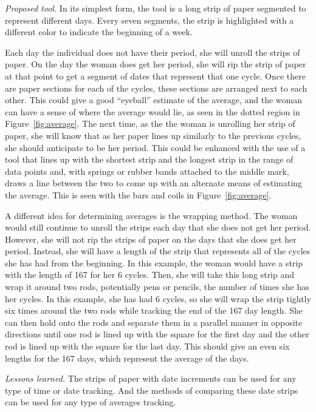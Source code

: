 \documentclass{sig-alternate}
\begin{document}
\emph{Proposed tool.}
In its simplest form, the tool is a long strip of paper segmented to represent different days. Every seven segments, the strip is highlighted with a different color to indicate the beginning of a week.

Each day the individual does not have their period, she will unroll the strips of paper. 
On the day the woman does get her period, she will rip the strip of paper at that point to get a segment of dates that represent that one cycle. Once there are paper sections for each of the cycles, these sections are arranged next to each other. This could give a good ``eyeball'' estimate of the average, and the woman can have a sense of where the average would lie, as seen in the dotted region in Figure~\ref{fig:average}. The next time, as the the woman is unrolling her strip of paper, she will know that as her paper lines up similarly to the previous cycles, she should anticipate to be her period. This could be enhanced with the use of a tool that lines up with the shortest strip and the longest strip in the range of data points and, with springs or rubber bands attached to the middle mark, draws a line between the two to come up with an alternate means of estimating the average. This is seen with the bars and coils in Figure~\ref{fig:average}.

A different idea for determining averages is the wrapping method. The woman would still continue to unroll the strips each day that she does not get her period. However, she will not rip the strips of paper on the days that she does get her period. Instead, she will have a length of the strip that represents all of the cycles she has had from the beginning. In this example, the woman would have a strip with the length of 167 for her 6 cycles. Then, she will take this long strip and wrap it around two rods, potentially pens or pencils, the number of times she has her cycles. In this example, she has had 6 cycles, so she will wrap the strip tightly six times around the two rods while tracking the end of the 167 day length. She can then hold onto the rods and separate them in a parallel manner in opposite directions until one rod is lined up with the square for the first day and the other rod is lined up with the square for the last day. This should give an even six lengths for the 167 days, which represent the average of the days.

\emph{Lessons learned.}
The strips of paper with date increments can be used for any type of time or date tracking. And the methods of comparing these date strips can be used for any type of averages tracking. 
\end{document}
